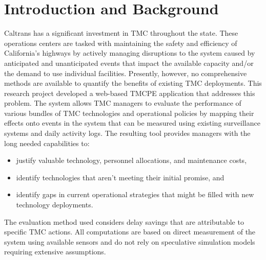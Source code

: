 \documentclass[12pt]{report}
\newcounter{space}
\begin{document}
\clearpage{}

\begin{singlespace}
  \tableofcontents

  \clearpage
  
  \listoffigures
  
  \clearpage
  
  \listoftables
  
\end{singlespace}

\clearpage



\clearpage

\acresetall

\setcounter{page}{0}

\chapter{Introduction and Background}
\label{sec:intro}


Caltrans has a significant investment in \ac{TMC} throughout the
state. These operations centers are tasked with maintaining the safety
and efficiency of California's highways by actively managing
disruptions to the system caused by anticipated and unanticipated
events that impact the available capacity and/or the demand to use
individual facilities.  Presently, however, no comprehensive methods
are available to quantify the benefits of existing \ac{TMC}
deployments. This research project developed a web-based \ac{TMCPE}
application that addresses this problem. The system allows \ac{TMC}
managers to evaluate the performance of various bundles of \ac{TMC}
technologies and operational policies by mapping their effects onto
events in the system that can be measured using existing surveillance
systems and daily activity logs. The resulting tool provides managers
with the long needed capabilities to:
\begin{itemize}
\item justify valuable technology, personnel allocations, and
  maintenance costs,
\item identify technologies that aren't meeting their initial promise,
  and
\item identify gaps in current operational strategies that might be
  filled with new technology deployments.
\end{itemize}
The evaluation method used considers delay savings that are
attributable to specific \ac{TMC} actions.  All computations are based
on direct measurement of the system using available sensors and do not
rely on speculative simulation models requiring extensive assumptions.
\end{document}
